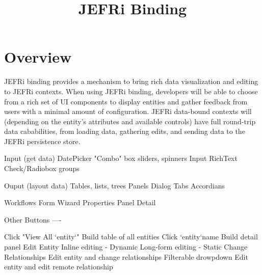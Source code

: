 \documentclass{article}
\begin{document}
\title{JEFRi Binding}
\maketitle
\tableofcontents
\newpage

\section{Overview}
JEFRi binding provides a mechanism to bring rich data visualization and editing
to JEFRi contexts. When using JEFRi binding, developers will be able to choose
from a rich set of UI components to display entities and gather feedback from
users with a minimal amount of configuration. JEFRi data-bound contexts will
(depending on the entity's attributes and available controls) have full
round-trip data cababilities, from loading data, gathering edits, and sending
data to the JEFRi persistence store.


Input (get data)
	DatePicker
	"Combo" box
	sliders, spinners
	Input
	RichText
	Check/Radiobox groups

Ouput (layout data)
	Tables, lists, trees
	Panels
		Dialog
		Tabs
		Accordians

Workflows
	Form
	Wizard
	Properties Panel
	Detail

Other
	Buttons
----

Click "View All `entity`"
	Build table of all entities
Click `entity`name
	Build detail panel
Edit Entity
	Inline editing - Dynamic
	Long-form editing - Static
Change Relationships
	Edit entity and change relationships
		Filterable drowpdown
	Edit entity and edit remote relationship
\end{document}
